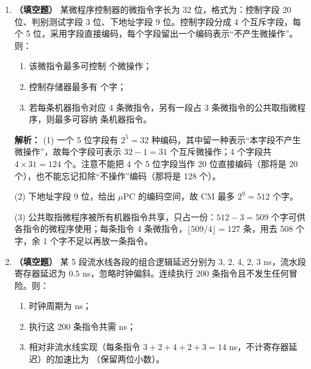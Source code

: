 \begin{enumerate}
\ifshowsolutions\par\noindent\textbf{解析：} 相邻两条 ALU 指令：前一条在 EX 段末已得到结果，后一条下一周期才进 EX，经 EX/MEM$\to$EX 转发即可，不需要阻塞，(A) 错。load-use：\texttt{lw} 的数据到 MEM 段末才从存储器取出，而紧随其后的指令在下一周期 EX 段开始就要用该数据，转发通路来不及在本拍开始前把数据送到 ALU 输入端，只能让消费者在 ID 段多停一拍，(B) 对，(C) 的说法把“下一周期可用”偷换成了“同一周期可用”。结构冒险源于硬件资源数量不足（如单端口存储器被取指和访存同时争用），重排指令只能减少冲突发生的次数，不能改变资源数量，因此谈不上“完全消除”，(D) 错。\else \answerarea \fi

\item \textbf{（填空题）} 某微程序控制器的微指令字长为 32 位，格式为：控制字段 20 位、判别测试字段 3 位、下地址字段 9 位。控制字段分成 4 个互斥字段，每个 5 位，采用字段直接编码，每个字段留出一个编码表示“不产生微操作”。则：
\begin{enumerate}
    \item[(1)] 该微指令最多可控制 \underline{\qquad} 个微操作；
    \item[(2)] 控制存储器最多有 \underline{\qquad} 个字；
    \item[(3)] 若每条机器指令对应 4 条微指令，另有一段占 3 条微指令的公共取指微程序，则最多可容纳 \underline{\qquad} 条机器指令。
\end{enumerate}

\ifshowsolutions\par\noindent\textbf{解析：} (1) 一个 5 位字段有 $2^5=32$ 种编码，其中留一种表示“本字段不产生微操作”，故每个字段可表示 $32-1=31$ 个互斥微操作；4 个字段共 $4\times31=124$ 个。注意不能把 4 个 5 位字段当作 20 位直接编码（那将是 20 个），也不能忘记扣除“不操作”编码（那将是 128 个）。

(2) 下地址字段 9 位，给出 $\mu$PC 的编码空间，故 CM 最多 $2^9=512$ 个字。

(3) 公共取指微程序被所有机器指令共享，只占一份：$512-3=509$ 个字可供各指令的微程序使用；每条指令 4 条微指令，$\lfloor 509/4\rfloor=127$ 条，用去 508 个字，余 1 个字不足以再放一条指令。\else \answerarea \fi

\item \textbf{（填空题）} 某 5 段流水线各段的组合逻辑延迟分别为 $3,\,2,\,4,\,2,\,3$ ns，流水段寄存器延迟为 $0.5$ ns，忽略时钟偏斜。连续执行 200 条指令且不发生任何冒险。则：
\begin{enumerate}
    \item[(1)] 时钟周期为 \underline{\qquad} ns；
    \item[(2)] 执行这 200 条指令共需 \underline{\qquad} ns；
    \item[(3)] 相对非流水线实现（每条指令 $3+2+4+2+3=14$ ns，不计寄存器延迟）的加速比为 \underline{\qquad}（保留两位小数）。
\end{enumerate}


\end{enumerate}
